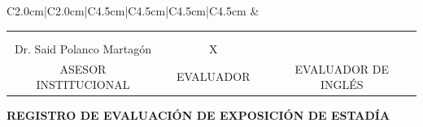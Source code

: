 \documentclass[12pt]{article}
\newcommand{\nasesorinstitucional}{Dr. Said Polanco Martagón}
\newcommand{\nevalador}{X}
\newcommand{\separacionLarga}{0.5cm}
\begin{document}
\begin{landscape}
\begin{tabular}{C{2.0cm}|C{2.0cm}|C{4.5cm}|C{4.5cm}|C{4.5cm}|C{4.5cm}}
&
 \\  \hline

\end{tabular}



\normalsize



\begin{center}
\begin{tabular}{cp{1cm}cp{1cm}c}
 & & & & \\
  & & & & \\
\hline 
\nasesorinstitucional & & \nevalador & & \\
ASESOR INSTITUCIONAL & &EVALUADOR & &EVALUADOR DE INGLÉS \\
\end{tabular}
\end{center}


\end{landscape} 
\restoregeometry

\clearpage
\pagestyle{empty}

\vspace*{0.5cm}



\large
\begin{center}
\textbf{REGISTRO DE EVALUACIÓN DE EXPOSICIÓN DE ESTADÍA}
\\[\separacionLarga]
\end{center}
\end{document}
